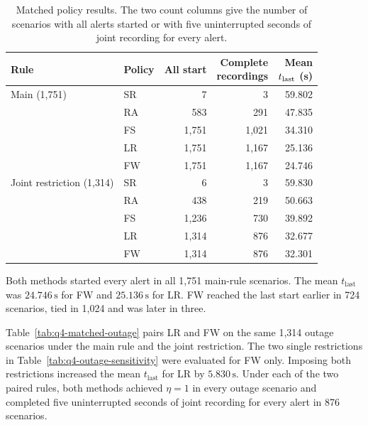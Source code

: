 \documentclass{swmcmthesis}
\begin{document}
\begin{table}[!htbp]
    \centering
    \caption{Matched policy results. The two count columns give the number of scenarios with all alerts started or with five uninterrupted seconds of joint recording for every alert.}
    \label{tab:q4-alternatives}
    \setlength{\tabcolsep}{4pt}
    \begin{tabular}{@{}llrrr@{}}
        \toprule
        Rule & Policy & All start & \shortstack[r]{Complete\\recordings} & \shortstack[r]{Mean\\\(t_{\rm last}\) (s)} \\
        \midrule
        Main (1,751) & SR & 7 & 3 & 59.802 \\
                    & RA & 583 & 291 & 47.835 \\
                    & FS & 1,751 & 1,021 & 34.310 \\
                    & LR & 1,751 & 1,167 & 25.136 \\
                    & FW & 1,751 & 1,167 & 24.746 \\
        \addlinespace
        Joint restriction (1,314) & SR & 6 & 3 & 59.830 \\
                                & RA & 438 & 219 & 50.663 \\
                                & FS & 1,236 & 730 & 39.892 \\
                                & LR & 1,314 & 876 & 32.677 \\
                                & FW & 1,314 & 876 & 32.301 \\
        \bottomrule
    \end{tabular}
\end{table}

Both methods started every alert in all 1,751 main-rule scenarios. The mean \(t_{\mathrm{last}}\) was \(24.746\,\mathrm s\) for FW and \(25.136\,\mathrm s\) for LR. FW reached the last start earlier in 724 scenarios, tied in 1,024 and was later in three.

Table~\ref{tab:q4-matched-outage} pairs LR and FW on the same 1,314 outage scenarios under the main rule and the joint restriction. The two single restrictions in Table~\ref{tab:q4-outage-sensitivity} were evaluated for FW only. Imposing both restrictions increased the mean \(t_{\mathrm{last}}\) for LR by \(5.830\,\mathrm s\). Under each of the two paired rules, both methods achieved \(\eta=1\) in every outage scenario and completed five uninterrupted seconds of joint recording for every alert in 876 scenarios.
\end{document}
